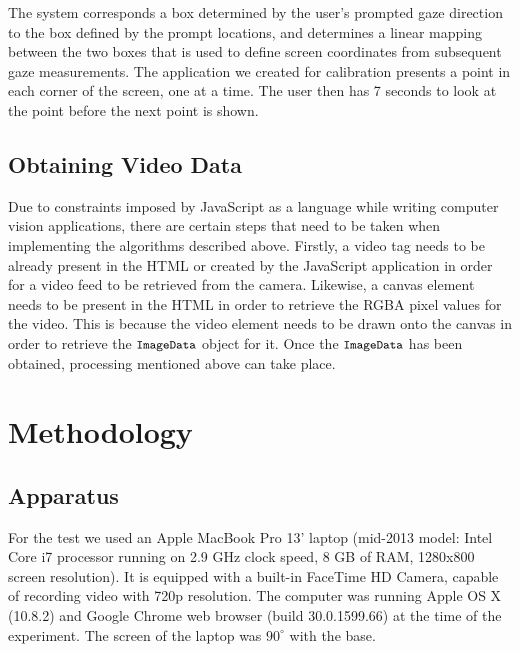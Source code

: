\documentclass[annual]{acmsiggraph}
\newcommand{\Acronym}[1]{\ensuremath{{\small{\texttt{#1}}}}}
\begin{document}
The system corresponds a box determined by the user's prompted gaze direction
to the box defined by the prompt locations, and determines a linear mapping
between the two boxes that is used to define screen coordinates from subsequent
gaze measurements. The application we created for calibration presents a point
in each corner of the screen, one at a time. The user then has 7 seconds to
look at the point before the next point is shown.

\subsection{Obtaining Video Data}

%
%
%

Due to constraints imposed by JavaScript as a language while writing computer
vision applications, there are certain steps that need to be taken when
implementing the algorithms described above. Firstly, a video tag needs to be
already present in the HTML or created by the JavaScript application in order
for a video feed to be retrieved from the camera. Likewise, a canvas element
needs to be present in the HTML in order to retrieve the RGBA pixel values for
the video.  This is because the video element needs to be drawn onto the canvas
in order to retrieve the $\Acronym{ImageData}$ object for it. Once the
$\Acronym{ImageData}$ has been obtained, processing mentioned above can take
place.

\section{Methodology}

\subsection{Apparatus}

For the test we used an Apple MacBook Pro 13' laptop (mid-2013 model: Intel
Core i7 processor running on 2.9 GHz clock speed, 8 GB of RAM, 1280x800 screen
resolution).  It is equipped with a built-in FaceTime HD Camera, capable of
recording video with 720p resolution. The computer was running Apple OS X
(10.8.2) and Google Chrome web browser (build 30.0.1599.66) at the time of the
experiment. The screen of the laptop was $90^{\circ}$ with the base.
\end{document}
